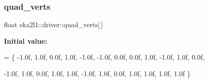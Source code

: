 \subsubsection{\texorpdfstring{quad\+\_\+verts}{quad\_verts}}
{\footnotesize\ttfamily float eka2l1\+::driver\+::quad\+\_\+verts\mbox{[}$\,$\mbox{]}}

{\bfseries Initial value\+:}
\begin{DoxyCode}
= \{ 
            -1.0f,  1.0f,  0.0f, 1.0f,
            -1.0f, -1.0f,  0.0f, 0.0f,
            1.0f, -1.0f,  1.0f, 0.0f,

            -1.0f,  1.0f,  0.0f, 1.0f,
            1.0f, -1.0f,  1.0f, 0.0f,
            1.0f,  1.0f,  1.0f, 1.0f
        \}
\end{DoxyCode}
